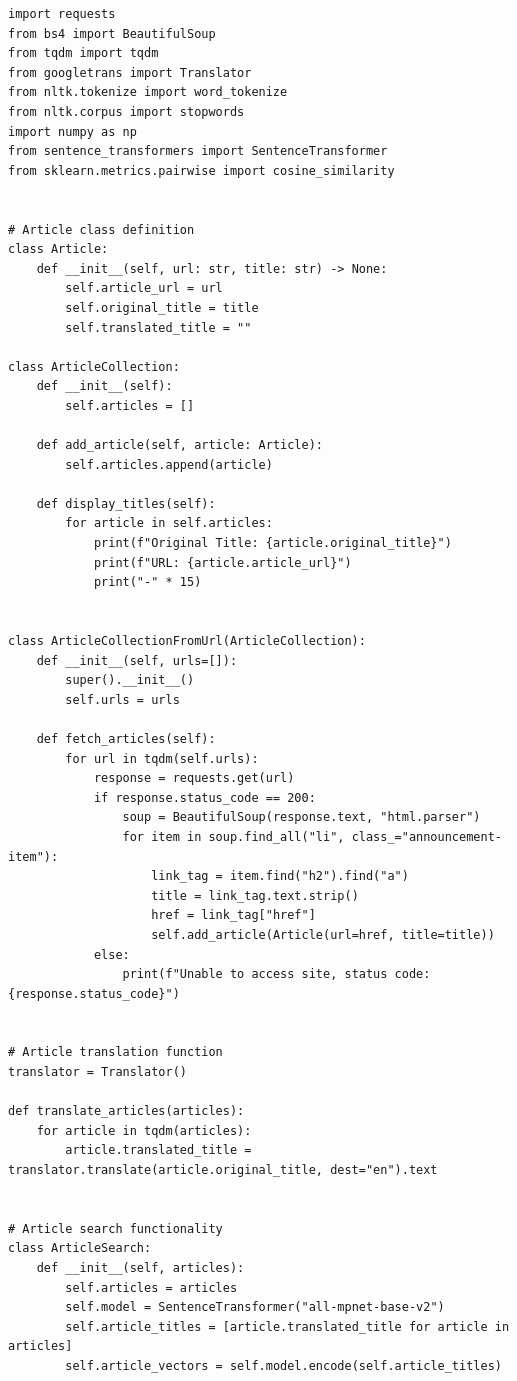 \small
\begin{lstlisting}
import requests
from bs4 import BeautifulSoup
from tqdm import tqdm
from googletrans import Translator
from nltk.tokenize import word_tokenize
from nltk.corpus import stopwords
import numpy as np
from sentence_transformers import SentenceTransformer
from sklearn.metrics.pairwise import cosine_similarity


# Article class definition
class Article:
    def __init__(self, url: str, title: str) -> None:
        self.article_url = url
        self.original_title = title
        self.translated_title = ""

class ArticleCollection:
    def __init__(self):
        self.articles = []

    def add_article(self, article: Article):
        self.articles.append(article)

    def display_titles(self):
        for article in self.articles:
            print(f"Original Title: {article.original_title}")
            print(f"URL: {article.article_url}")
            print("-" * 15)


class ArticleCollectionFromUrl(ArticleCollection):
    def __init__(self, urls=[]):
        super().__init__()
        self.urls = urls

    def fetch_articles(self):
        for url in tqdm(self.urls):
            response = requests.get(url)
            if response.status_code == 200:
                soup = BeautifulSoup(response.text, "html.parser")
                for item in soup.find_all("li", class_="announcement-item"):
                    link_tag = item.find("h2").find("a")
                    title = link_tag.text.strip()
                    href = link_tag["href"]
                    self.add_article(Article(url=href, title=title))
            else:
                print(f"Unable to access site, status code: {response.status_code}")


# Article translation function
translator = Translator()

def translate_articles(articles):
    for article in tqdm(articles):
        article.translated_title = translator.translate(article.original_title, dest="en").text


# Article search functionality
class ArticleSearch:
    def __init__(self, articles):
        self.articles = articles
        self.model = SentenceTransformer("all-mpnet-base-v2")
        self.article_titles = [article.translated_title for article in articles]
        self.article_vectors = self.model.encode(self.article_titles)


\end{lstlisting}

